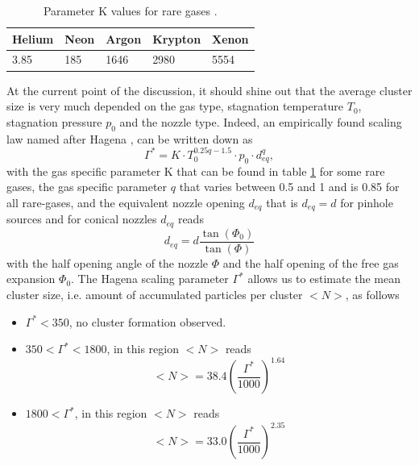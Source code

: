 \begin{table}
	\centering
		\begin{tabular}{ | l | l | l | l | l | }
			\hline
			Helium & Neon & Argon & Krypton & Xenon \\ \hline
			3.85 & 185 & 1646 & 2980 & 5554 \\ \hline
		\end{tabular}
	\caption{Parameter K values for rare gases \cite{Schorb-2012-Thesis}.}
	\label{tab:k-parameter}
\end{table}
At the current point of the discussion, it should shine out that the average cluster size is very much depended on the gas type, stagnation temperature $T_{0}$, stagnation pressure $p_{0}$ and the nozzle type. Indeed, an empirically found scaling law named after Hagena \cite{Hagena-1972-JCP,Hagena-1981-SurfSci,Hagena-1987-ZeitschriftAMC}, can be written down as
\begin{equation}
\Gamma^{*} = K \cdot T_{0}^{0.25q-1.5} \cdot p_{0} \cdot d_{eq}^{q},
\label{eq:Hagena-parameter}
\end{equation}
with the gas specific parameter K that can be found in table \ref{tab:k-parameter} for some rare gases, the gas specific parameter $q$ that varies between 0.5 and 1 and is 0.85 for all rare-gases, and the equivalent nozzle opening $d_{eq}$ that is $d_{eq}=d$ for pinhole sources and for conical nozzles $d_{eq}$ reads
\begin{equation}
d_{eq} = d\frac{\tan\left(\Phi_{0}\right)}{\tan\left(\Phi\right)}
\label{eq:equivalent-nozzle-opening}
\end{equation}
with the half opening angle of the nozzle $\Phi$ and the half opening of the free gas expansion $\Phi_{0}$. The Hagena scaling parameter $\Gamma^{*}$ allows us to estimate the mean cluster size, i.e. amount of accumulated particles per cluster $<N>$, as follows
\begin{itemize}
	\item $\Gamma^{*} < 350$, no cluster formation observed.
	\item $350 < \Gamma^{*} < 1800$, in this region $<N>$ reads
		\begin{equation}
		<N> = 38.4 \left(\frac{\Gamma^{*}}{1000}\right)^{1.64}
		\label{eq:intermediate-hagena-scaling}
		\end{equation}
	\item $1800 < \Gamma^{*}$, in this region $<N>$ reads
		\begin{equation}
		<N> = 33.0 \left(\frac{\Gamma^{*}}{1000}\right)^{2.35}
		\label{eq:large-hagena-scaling}
		\end{equation}
\end{itemize}
